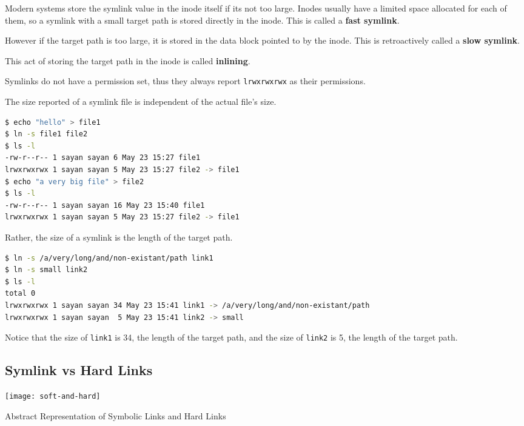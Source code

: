Modern systems store the symlink value in the inode itself if its not too large.
Inodes usually have a limited space allocated for each of them, so a symlink with a small target path is stored directly in the inode.
This is called a \textbf{fast symlink}.

However if the target path is too large, it is stored in the data block pointed to by the inode.
This is retroactively called a \textbf{slow symlink}.

This act of storing the target path in the inode is called \textbf{inlining}.

Symlinks do not have a permission set, thus they always report \texttt{lrwxrwxrwx} as their permissions.

The size reported of a symlink file is independent of the actual file's size.

\begin{lstlisting}[language=bash]
$ echo "hello" > file1
$ ln -s file1 file2
$ ls -l
-rw-r--r-- 1 sayan sayan 6 May 23 15:27 file1
lrwxrwxrwx 1 sayan sayan 5 May 23 15:27 file2 -> file1
$ echo "a very big file" > file2
$ ls -l
-rw-r--r-- 1 sayan sayan 16 May 23 15:40 file1
lrwxrwxrwx 1 sayan sayan 5 May 23 15:27 file2 -> file1
\end{lstlisting}

Rather, the size of a symlink is the length of the target path.

\begin{lstlisting}[language=bash]
$ ln -s /a/very/long/and/non-existant/path link1
$ ln -s small link2
$ ls -l
total 0
lrwxrwxrwx 1 sayan sayan 34 May 23 15:41 link1 -> /a/very/long/and/non-existant/path
lrwxrwxrwx 1 sayan sayan  5 May 23 15:41 link2 -> small
\end{lstlisting}

Notice that the size of \texttt{link1} is 34, the length of the target path, and the size of \texttt{link2} is 5, the length of the target path.

\subsection{Symlink vs Hard Links}

\begin{marginfigure}
  \texttt{[image: soft-and-hard]}
  \caption[Abstract Representation of Symbolic Links and Hard Links]{Abstract Representation of Symbolic Links and Hard Links}
\end{marginfigure}

